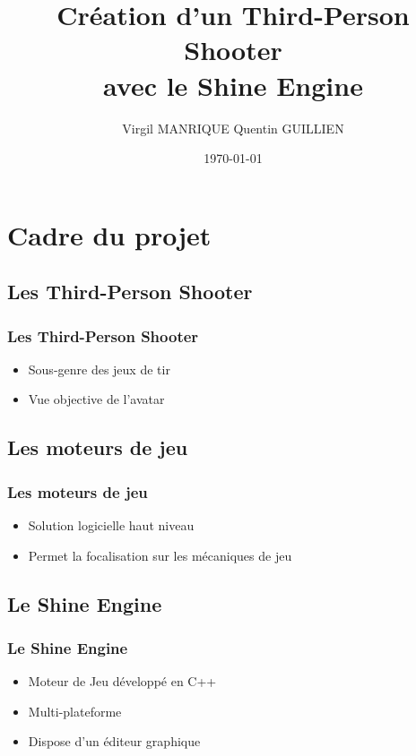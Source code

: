 \documentclass[handout]{beamer}
\title[Création d’un TPS avec le Shine Engine]{Création d’un Third-Person Shooter\\ avec le Shine Engine}
\author{Virgil MANRIQUE \hspace{2mm} Quentin GUILLIEN}
\institute{Université de Franche-Comté}
\date{\today}
\begin{document}
\begin{frame}
\titlepage

\end{frame}





\section{Cadre du projet}

\subsection{Les Third-Person Shooter}
\begin{frame}
\frametitle{Les Third-Person Shooter}

\begin{itemize}
\item
Sous-genre des jeux de tir
\item
Vue objective de l'avatar
\end{itemize}

\end{frame}

\subsection{Les moteurs de jeu}
\begin{frame}
\frametitle{Les moteurs de jeu}

\begin{itemize}
\item
Solution logicielle haut niveau
\item
Permet la focalisation sur les mécaniques de jeu
\end{itemize}
\end{frame}

\subsection{Le Shine Engine}
\begin{frame}
\frametitle{Le Shine Engine}
\begin{itemize}
\item
Moteur de Jeu développé en C++
\item
Multi-plateforme 
\item
Dispose d'un éditeur graphique

\end{itemize}

\end{frame}
\end{document}
